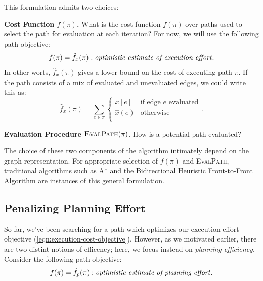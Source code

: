 \noindent
This formulation admits two choices:

\textbf{Cost Function $f(\pi)$.}
What is the cost function $f(\pi)$ over paths used to select the
path for evaluation at each iteration?
For now, we will use the following path objective:
\begin{equation}
   f(\pi) = \hat{f}_x(\pi): \mbox{\emph{optimistic estimate of execution effort}}.
\end{equation}
In other worts, $\hat{f}_x(\pi)$
gives a lower bound on the cost of executing
path $\pi$.
If the path consists of a mix of evaluated and unevaluated edges,
we could write this as:
\begin{equation}
   \hat{f}_x(\pi) = \sum_{e \in \pi} \left\{
   \begin{array}{cl}
      x[e] & \mbox{if edge } e \mbox{ evaluated}  \\
      \hat{x}(e) & \mbox{otherwise} \\
   \end{array}
   \right.
   .
   \label{eqn:execution-cost-objective}
\end{equation}

\textbf{Evaluation Procedure $\mbox{\sc EvalPath}(\pi)$}.
How is a potential path evaluated?

The choice of these two components of the algorithm
intimately depend on the graph representation.
For appropriate selection
of $f(\pi)$ and \textsc{EvalPath},
traditional algorithms such as A* \citep{hart1968astar}
and the Bidirectional Heuristic Front-to-Front Algorithm
\citep{sint1977bhffa}
are instances of this general formulation.

\subsection{Penalizing Planning Effort}

So far, we've been searching for a path which optimizes our execution
effort objective (\ref{eqn:execution-cost-objective}).
However, as we motivated earlier,
there are two distint notions of efficency;
here, we focus instead on \emph{planning efficiency}.
Consider the following path objective:
\begin{equation}
   f(\pi) = \hat{f}_p(\pi) : \mbox{\emph{optimistic estimate of planning effort}}.
\end{equation}


